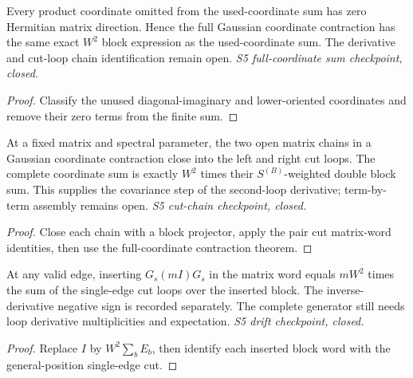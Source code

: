 \begin{lemma}
  \label{lem:loop-contraction-unused}
  \leanok
  Every product coordinate omitted from the used-coordinate sum has zero
  Hermitian matrix direction. Hence the full Gaussian coordinate contraction
  has the same exact $W^2$ block expression as the used-coordinate sum.
  The derivative and cut-loop chain identification remain open.
  \emph{S5 full-coordinate sum checkpoint, closed.}
\end{lemma}
\begin{proof}\leanok
  Classify the unused diagonal-imaginary and lower-oriented coordinates and
  remove their zero terms from the finite sum.
\end{proof}

\begin{lemma}
  \label{lem:loop-contraction-cutwords}
  \leanok
  At a fixed matrix and spectral parameter, the two open matrix chains in
  a Gaussian coordinate contraction close into the left and right cut loops.
  The complete coordinate sum is exactly $W^2$ times their
  $S^{(B)}$-weighted double block sum. This supplies the covariance step of
  the second-loop derivative; term-by-term assembly remains open.
  \emph{S5 cut-chain checkpoint, closed.}
\end{lemma}
\begin{proof}\leanok
  Close each chain with a block projector, apply the pair cut matrix-word
  identities, then use the full-coordinate contraction theorem.
\end{proof}

\begin{lemma}
  \label{lem:loop-contraction-drift}
  \leanok
  At any valid edge, inserting $G_s(mI)G_s$ in the matrix word equals
  $mW^2$ times the sum of the single-edge cut loops over the inserted block.
  The inverse-derivative negative sign is recorded separately. The complete
  generator still needs loop derivative multiplicities and expectation.
  \emph{S5 drift checkpoint, closed.}
\end{lemma}
\begin{proof}\leanok
  Replace $I$ by $W^2\sum_b E_b$, then identify each inserted block word with
  the general-position single-edge cut.
\end{proof}

